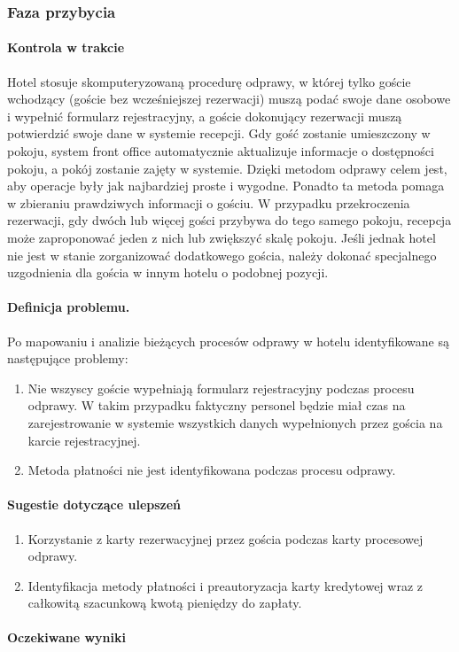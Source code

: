 \documentclass[a4paper, 12pt]{article}
\begin{document}
\subsubsection{Faza przybycia}
\paragraph{Kontrola w trakcie} 
Hotel stosuje skomputeryzowaną procedurę odprawy, w której tylko goście wchodzący (goście bez wcześniejszej rezerwacji) muszą podać swoje dane osobowe i wypełnić formularz rejestracyjny, a goście dokonujący rezerwacji muszą potwierdzić swoje dane w systemie recepcji.\newline
\hspace*{1cm}Gdy gość zostanie umieszczony w pokoju, system front office automatycznie aktualizuje informacje o dostępności pokoju, a pokój zostanie zajęty w systemie. Dzięki metodom odprawy celem jest, aby operacje były jak najbardziej proste i wygodne. Ponadto ta metoda pomaga w zbieraniu prawdziwych informacji o gościu.\newline
\hspace*{1cm}W przypadku przekroczenia rezerwacji, gdy dwóch lub więcej gości przybywa do tego samego pokoju, recepcja może zaproponować jeden z nich lub zwiększyć skalę pokoju. Jeśli jednak hotel nie jest w stanie zorganizować dodatkowego gościa, należy dokonać specjalnego uzgodnienia dla gościa w innym hotelu o podobnej pozycji.
\paragraph{Definicja problemu.}
Po mapowaniu i analizie bieżących procesów odprawy w hotelu identyfikowane są następujące problemy:
\begin{enumerate}
	\item Nie wszyscy goście wypełniają formularz rejestracyjny podczas procesu odprawy. W takim przypadku faktyczny personel będzie miał czas na zarejestrowanie w systemie wszystkich danych wypełnionych przez gościa na karcie rejestracyjnej.
	\item Metoda płatności nie jest identyfikowana podczas procesu odprawy.
\end{enumerate}
\paragraph{Sugestie dotyczące ulepszeń}
\begin{enumerate}
	\item Korzystanie z karty rezerwacyjnej przez gościa podczas karty procesowej odprawy.
	\item Identyfikacja metody płatności i preautoryzacja karty kredytowej wraz z całkowitą szacunkową kwotą pieniędzy do zapłaty.
\end{enumerate}
\paragraph{Oczekiwane wyniki}


\label{LastPage}~
\label{LastPageOfBackMatter}~		
\end{document}
